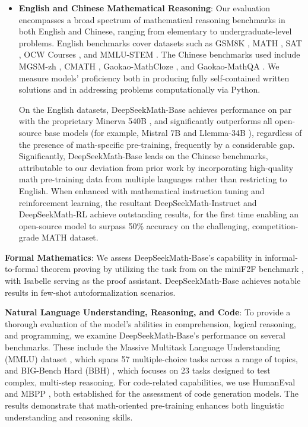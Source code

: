 \begin{itemize}[topsep=0pt]
    \item \textbf{English and Chinese Mathematical Reasoning}: Our evaluation encompasses a broad spectrum of mathematical reasoning benchmarks in both English and Chinese, ranging from elementary to undergraduate-level problems. English benchmarks cover datasets such as GSM8K \citep{gsm8k}, MATH \citep{MATH}, SAT \citep{llemma}, OCW Courses \citep{minerva}, and MMLU-STEM \citep{mmlu}. The Chinese benchmarks used include MGSM-zh \citep{mgsm}, CMATH \citep{wei2023cmath}, Gaokao-MathCloze \citep{agieval}, and Gaokao-MathQA \citep{agieval}. We measure models' proficiency both in producing fully self-contained written solutions and in addressing problems computationally via Python.

    On the English datasets, DeepSeekMath-Base achieves performance on par with the proprietary Minerva 540B \citep{minerva}, and significantly outperforms all open-source base models (for example, Mistral 7B \citep{mistral} and Llemma-34B \citep{llemma}), regardless of the presence of math-specific pre-training, frequently by a considerable gap. Significantly, DeepSeekMath-Base leads on the Chinese benchmarks, attributable to our deviation from prior work \citep{minerva,llemma} by incorporating high-quality math pre-training data from multiple languages rather than restricting to English. When enhanced with mathematical instruction tuning and reinforcement learning, the resultant DeepSeekMath-Instruct and DeepSeekMath-RL achieve outstanding results, for the first time enabling an open-source model to surpass 50\% accuracy on the challenging, competition-grade MATH dataset.
\end{itemize}

\item \textbf{Formal Mathematics}: We assess DeepSeekMath-Base's capability in informal-to-formal theorem proving by utilizing the task from \citep{dsp_proof} on the miniF2F benchmark \citep{minif2f}, with Isabelle \citep{isabelle} serving as the proof assistant. DeepSeekMath-Base achieves notable results in few-shot autoformalization scenarios.

\item \textbf{Natural Language Understanding, Reasoning, and Code}: To provide a thorough evaluation of the model's abilities in comprehension, logical reasoning, and programming, we examine DeepSeekMath-Base's performance on several benchmarks. These include the Massive Multitask Language Understanding (MMLU) dataset \citep{mmlu}, which spans 57 multiple-choice tasks across a range of topics, and BIG-Bench Hard (BBH) \citep{bbh}, which focuses on 23 tasks designed to test complex, multi-step reasoning. For code-related capabilities, we use HumanEval \citep{codex} and MBPP \citep{mbpp}, both established for the assessment of code generation models. The results demonstrate that math-oriented pre-training enhances both linguistic understanding and reasoning skills.

